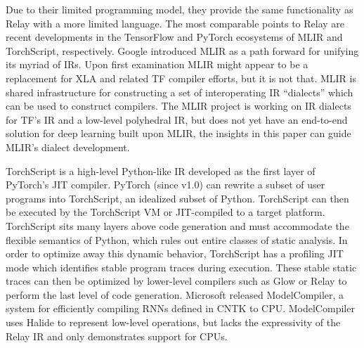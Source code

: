 Due to their limited programming model, they
    provide the same functionality as Relay with
    a more limited language.
The most comparable points to Relay are recent
    developments in the TensorFlow and PyTorch
    ecosystems of MLIR and TorchScript, respectively.
Google introduced MLIR as a path forward for
    unifying its myriad of IRs.
Upon first examination MLIR might appear to be
    a replacement for XLA and related TF compiler
    efforts, but it is not that.
MLIR is shared infrastructure for constructing
    a set of interoperating IR ``dialects'' which
    can be used to construct compilers.
The MLIR project is working on IR dialects
    for TF's IR and a low-level polyhedral IR,
    but does not yet have an end-to-end solution for
    deep learning built upon MLIR, the insights in
    this paper can guide MLIR's dialect development.

TorchScript is a high-level Python-like IR developed as the first
    layer of PyTorch's JIT compiler.
PyTorch (since v1.0) can rewrite a subset of user programs into
    TorchScript, an idealized subset of Python.
TorchScript can then be executed by the TorchScript VM or JIT-compiled to a target platform.
TorchScript sits many layers above code generation and must accommodate
    the flexible semantics of Python, which rules out entire classes of static analysis.
In order to optimize away this dynamic behavior, TorchScript has
    a profiling JIT mode which identifies stable program traces
    during execution.
These stable static traces can then be optimized by lower-level
    compilers such as Glow or Relay to perform the last level of code generation.
Microsoft released ModelCompiler, a system for efficiently compiling RNNs defined
    in CNTK to CPU.
ModelCompiler uses Halide to represent low-level operations, but lacks
    the expressivity of the Relay IR and only demonstrates support for CPUs.


